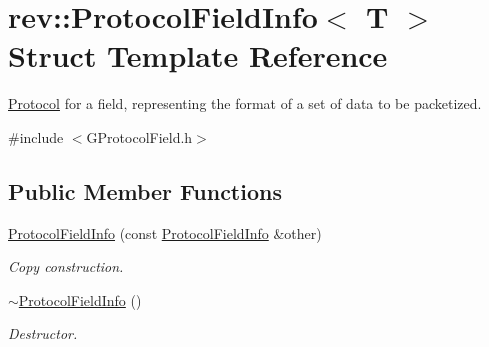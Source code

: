 \hypertarget{structrev_1_1_protocol_field_info}{}\section{rev\+::Protocol\+Field\+Info$<$ T $>$ Struct Template Reference}
\label{structrev_1_1_protocol_field_info}


\mbox{\hyperlink{classrev_1_1_protocol}{Protocol}} for a field, representing the format of a set of data to be packetized.  




{\ttfamily \#include $<$G\+Protocol\+Field.\+h$>$}

\subsection*{Public Member Functions}
\begin{DoxyCompactItemize}
\item 
\mbox{\label{structrev_1_1_protocol_field_info_a8c2a6ebd05c54ababe4db4bea3469fdf}} 
\mbox{\hyperlink{structrev_1_1_protocol_field_info_a8c2a6ebd05c54ababe4db4bea3469fdf}{Protocol\+Field\+Info}} (const \mbox{\hyperlink{structrev_1_1_protocol_field_info}{Protocol\+Field\+Info}} \&other)
\begin{DoxyCompactList}\small\item\em Copy construction. \end{DoxyCompactList}\item 
\mbox{\label{structrev_1_1_protocol_field_info_a51fff7132b4a12bd36cb7b6d3837f37a}} 
\mbox{\hyperlink{structrev_1_1_protocol_field_info_a51fff7132b4a12bd36cb7b6d3837f37a}{$\sim$\+Protocol\+Field\+Info}} ()
\begin{DoxyCompactList}\small\item\em Destructor. \end{DoxyCompactList}\end{DoxyCompactItemize}
